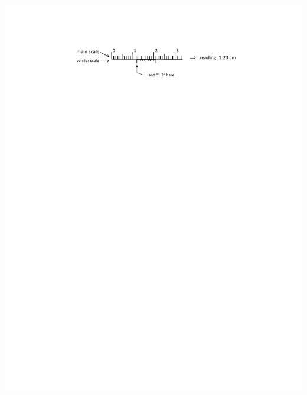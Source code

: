\begin{center}
\vspace{0.1in}
\includegraphics{appendices/instrumentation/vernier_1p2_cm.pdf}


\end{center}
